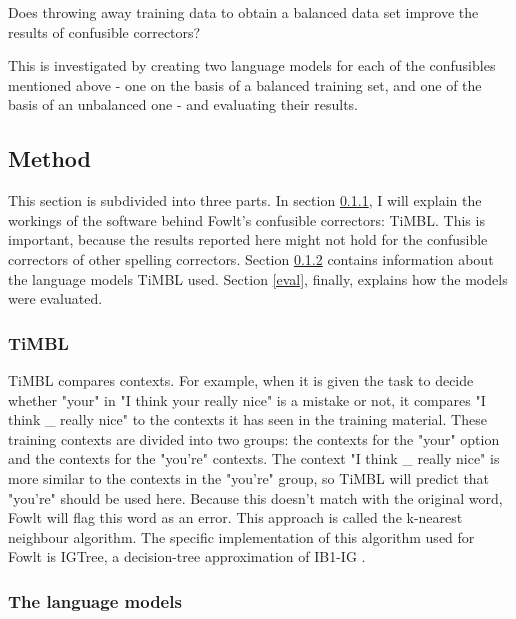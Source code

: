 \documentclass[12pt]{article}
\begin{document}
\begin{examples}

\item Does throwing away training data to obtain a balanced data set improve the results of confusible correctors?

\end{examples}

This is investigated by creating two language models for each of the confusibles mentioned above - one on the basis of a balanced training set, and one of the basis of an unbalanced one - and evaluating their results.


\subsection{Method}
This section is subdivided into three parts. In section \ref{timbl}, I will explain the workings of the software behind Fowlt's confusible correctors: TiMBL. This is important, because the results reported here might not hold for the confusible correctors of other spelling correctors. Section \ref{langmod} contains information about the language models  TiMBL used. Section \ref{eval}, finally, explains how the models were evaluated.


\subsubsection{TiMBL} \label{timbl}
TiMBL compares contexts. For example, when it is given the task to decide whether "your" in "I think your really nice" is a mistake or not, it compares "I think \_ really nice" to the contexts it has seen in the training material. These training contexts are divided into two groups: the contexts for the "your" option and the contexts for the "you're" contexts. The context "I think \_ really nice" is more similar to the contexts in the "you're" group, so TiMBL will predict that "you're" should be used here. Because this doesn't match with the original word, Fowlt will flag this word as an error. This approach is called the k-nearest neighbour algorithm. The specific implementation of this algorithm used for Fowlt is IGTree, a decision-tree approximation of IB1-IG \citep{dvdbw97}.

\subsubsection{The language models} \label{langmod}
\end{document}
